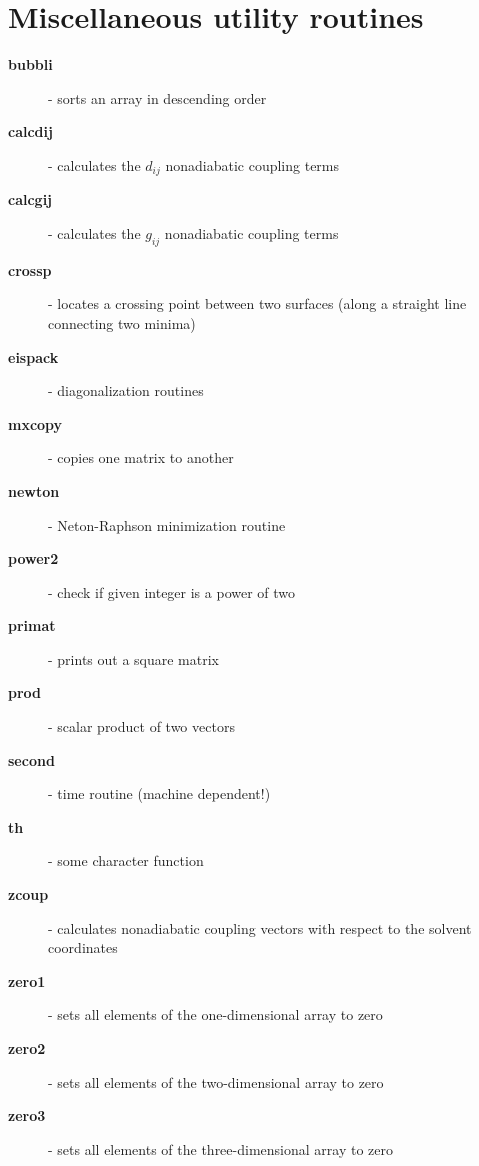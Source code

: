 \documentclass[oneside,11pt,openany]{book}
\newcommand{\tw}{\ttfamily}
\begin{document}
%
\section{Miscellaneous utility routines}
\begin{description}
\item[{\tw\bf bubbli}] - sorts an array in descending order
\item[{\tw\bf calcdij}] - calculates the $d_{ij}$ nonadiabatic coupling terms
\item[{\tw\bf calcgij}] - calculates the $g_{ij}$ nonadiabatic coupling terms
\item[{\tw\bf crossp}] - locates a crossing point between two surfaces
                     (along a straight line connecting two minima)
\item[{\tw\bf eispack}] - diagonalization routines
\item[{\tw\bf mxcopy}] - copies one matrix to another
\item[{\tw\bf newton}] - Neton-Raphson minimization routine
\item[{\tw\bf power2}] - check if given integer is a power of two
\item[{\tw\bf primat}] - prints out a square matrix
\item[{\tw\bf prod}] - scalar product of two vectors
\item[{\tw\bf second}] - time routine (machine dependent!)
\item[{\tw\bf th}] - some character function
\item[{\tw\bf zcoup}] - calculates nonadiabatic coupling vectors
                     with respect to the solvent coordinates
\item[{\tw\bf zero1}] - sets all elements of the one-dimensional array to zero
\item[{\tw\bf zero2}] - sets all elements of the two-dimensional array to zero
\item[{\tw\bf zero3}] - sets all elements of the three-dimensional array to zero
\end{description}


%
\end{document}
